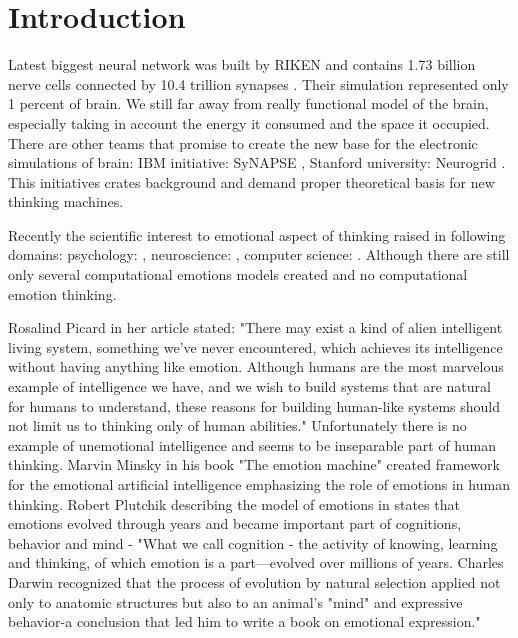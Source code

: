 \section{Introduction}

Latest biggest neural network was built by RIKEN and contains 1.73 billion nerve cells connected by 10.4 trillion synapses \cite{RIKEN}. Their simulation represented only 1 percent of brain. We still far away from really functional model of the brain, especially taking in account the energy it consumed and the space it occupied. There are other teams that promise to create the new base for the electronic simulations of brain: IBM initiative: SyNAPSE \cite{SyNAPSE}, Stanford university: Neurogrid \cite{Neurogrid}. This initiatives crates background and demand proper theoretical basis for new thinking machines.

Recently the scientific interest to emotional aspect of thinking raised in following domains: psychology: \cite{natureofemotions, appraisal_determinants_of_emotions, appraisal_considered_as_a_process, putting_appraisal_in_context, sex_differencies}, neuroscience: \cite{emotionsbraintorobot, parsingreward, neuromodulatory, cubeofemotions, natureofemotions, putting_appraisal_in_context, anatomic}, computer science: \cite{intelligent_machinery, emotionandsociable, senticcomputing, hourglass, affectivemodelofinterplay, affectivecomputing, dont_worry_be_happy, hourglass, senticcomputing, parsingreward, emotionsbraintorobot, motivationalrewardframework, roleofemotions, computationalmodelsemotionscognition}. Although there are still only several computational emotions models created \cite{computationalmodelsemotion, computationalmodelsemotionscognition, evaluatingcomutationalmodel, threelevel} and no computational emotion thinking.

Rosalind Picard in her article \cite{affectivecomputingchallanges} stated: "There may exist a kind of alien intelligent living system, something we’ve never encountered, which achieves its intelligence without having anything like emotion. Although humans are the most marvelous example of intelligence we have, and we wish to build systems that are natural for humans to understand, these reasons for building human-like systems should not limit us to thinking only of human abilities." Unfortunately there is no example of unemotional intelligence and seems to be inseparable part of human thinking. Marvin Minsky in his book "The emotion machine" \cite{emotionmachine} created framework for the emotional artificial intelligence emphasizing the role of emotions in human thinking. Robert Plutchik describing the model of emotions in \cite{natureofemotions} states that emotions evolved through years and became important part of cognitions, behavior and mind - "What we call cognition - the activity of knowing, learning and thinking, of which emotion is a part—evolved over millions of years. Charles Darwin recognized that the process of evolution by natural selection applied not only to anatomic structures but also to an animal’s "mind" and expressive behavior-a conclusion that led him to write a book on emotional expression."

